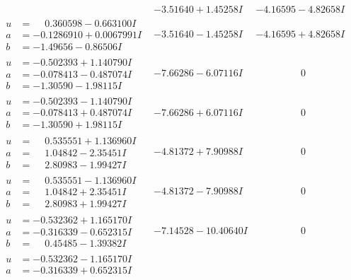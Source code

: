 \documentclass[1p]{elsarticle_modified}
\theoremstyle{definition}
\begin{document}
$$\begin{array}{c|c|c}
 & -3.51640 + 1.45258 I & -4.16595 - 4.82658 I \\ \hline\begin{aligned}
u &= \phantom{-}0.360598 - 0.663100 I \\
a &= -0.1286910 + 0.0067991 I \\
b &= -1.49656 - 0.86506 I\end{aligned}
 & -3.51640 - 1.45258 I & -4.16595 + 4.82658 I \\ \hline\begin{aligned}
u &= -0.502393 + 1.140790 I \\
a &= -0.078413 - 0.487074 I \\
b &= -1.30590 - 1.98115 I\end{aligned}
 & -7.66286 - 6.07116 I & \phantom{-0.000000 } 0 \\ \hline\begin{aligned}
u &= -0.502393 - 1.140790 I \\
a &= -0.078413 + 0.487074 I \\
b &= -1.30590 + 1.98115 I\end{aligned}
 & -7.66286 + 6.07116 I & \phantom{-0.000000 } 0 \\ \hline\begin{aligned}
u &= \phantom{-}0.535551 + 1.136960 I \\
a &= \phantom{-}1.04842 - 2.35451 I \\
b &= \phantom{-}2.80983 - 1.99427 I\end{aligned}
 & -4.81372 + 7.90988 I & \phantom{-0.000000 } 0 \\ \hline\begin{aligned}
u &= \phantom{-}0.535551 - 1.136960 I \\
a &= \phantom{-}1.04842 + 2.35451 I \\
b &= \phantom{-}2.80983 + 1.99427 I\end{aligned}
 & -4.81372 - 7.90988 I & \phantom{-0.000000 } 0 \\ \hline\begin{aligned}
u &= -0.532362 + 1.165170 I \\
a &= -0.316339 - 0.652315 I \\
b &= \phantom{-}0.45485 - 1.39382 I\end{aligned}
 & -7.14528 - 10.40640 I & \phantom{-0.000000 } 0 \\ \hline\begin{aligned}
u &= -0.532362 - 1.165170 I \\
a &= -0.316339 + 0.652315 I \\

\end{aligned}
\end{array}$$
\end{document}
